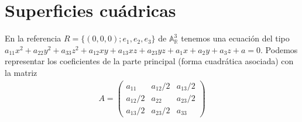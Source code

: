 \documentclass[14pt]{book}
\begin{document}
\chapter{Superficies cuádricas}


En la referencia $R = \{(0,0,0); e_1, e_2, e_3\}$ de $\mathbb{A}_\mathbb{R}^3$ tenemos una ecuación del tipo $a_{11}x^2 + a_{22}y^2 + a_{33}z^2 + a_{12}xy + a_{13}xz + a_{23}yz + a_1x + a_2y + a_3z + a = 0$. Podemos representar los coeficientes de la parte principal (forma cuadrática asociada) con la matriz
\begin{align}
	A = \left(\begin{array}{ccc}
	a_{11} & a_{12}/2 & a_{13}/2 \\
	a_{12}/2 & a_{22} & a_{23}/2 \\
	a_{13}/2 & a_{23}/2 & a_{33}
	\end{array}\right)
\end{align}
\end{document}
